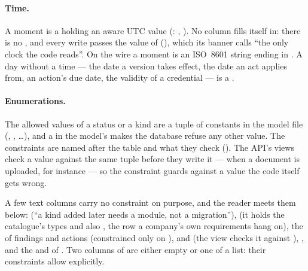 \paragraph{Time.} A moment is a  holding an aware UTC value
(: , ). No column fills itself
in: there is no , and every write passes the value of 
(), which its banner calls \enquote{the only clock the code reads}.
On the wire a moment is an ISO~8601 string ending in . A day without a time ---
the date a version takes effect, the date an act applies from, an action's due date, the
validity of a credential --- is a .

\paragraph{Enumerations.} The allowed values of a status or a kind are a tuple of constants in
the model file (, , \dots), and a
 in the model's  makes the database refuse any
other value. The constraints are named after the table and what they check (). The API's views check a value
against the same tuple before they write it ---  when a document is
uploaded, for instance --- so the constraint guards against a value the code itself gets wrong.


A few text columns carry no constraint on purpose, and the reader meets them below:
 (\enquote{a kind added later needs a module, not a migration}),
 (it holds the catalogue's types and also , the row
a company's own requirements hang on), the  of findings and actions (constrained
only on ),  and
 (the view checks it against ),
,  and the  and
 of . Two columns of
 are either empty or one of a list: their constraints allow
 explicitly.

